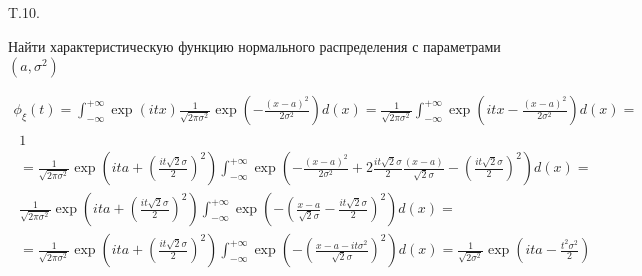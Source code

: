 \documentclass[a4paper,12pt]{article} %
\begin{document}
\begin{example} T.10. 


Найти характеристическую функцию нормального распределения с параметрами $\left(a, \sigma^{2}\right)$





\begin{equation}
\begin{array}{l}
\phi_{\xi}(t)=\int_{-\infty}^{+\infty} \exp (i t x) \frac{1}{\sqrt{2 \pi \sigma^{2}}} \exp \left(-\frac{(x-a)^{2}}{2 \sigma^{2}}\right) d(x)=\frac{1}{\sqrt{2 \pi \sigma^{2}}} \int_{-\infty}^{+\infty} \exp \left(i t x-\frac{(x-a)^{2}}{2 \sigma^{2}}\right) d(x)= \\
\begin{array}{c}
1 \\
=\frac{1}{\sqrt{2 \pi \sigma^{2}}} \exp \left(i t a+\left(\frac{i t \sqrt{2} \sigma}{2}\right)^{2}\right) \int_{-\infty}^{+\infty} \exp \left(-\frac{(x-a)^{2}}{2 \sigma^{2}}+2 \frac{i t \sqrt{2} \sigma}{2} \frac{(x-a)}{\sqrt{2} \sigma}-\left(\frac{i t \sqrt{2} \sigma}{2}\right)^{2}\right) d(x)= \\
\frac{1}{\sqrt{2 \pi \sigma^{2}}} \exp \left(i t a+\left(\frac{i t \sqrt{2} \sigma}{2}\right)^{2}\right) \int_{-\infty}^{+\infty} \exp \left(-\left(\frac{x-a}{\sqrt{2} \sigma}-\frac{i t \sqrt{2} \sigma}{2}\right)^{2}\right) d(x)= \\
=\frac{1}{\sqrt{2 \pi \sigma^{2}}} \exp \left(i t a+\left(\frac{i t \sqrt{2} \sigma}{2}\right)^{2}\right) \int_{-\infty}^{+\infty} \exp \left(-\left(\frac{x-a-i t \sigma^{2}}{\sqrt{2} \sigma}\right)^{2}\right) d(x)=\frac{1}{\sqrt{2 \sigma^{2}}} \exp \left(i t a-\frac{t^{2} \sigma^{2}}{2}\right)
\end{array}
\end{array}
\end{equation}









\end{example}
\end{document}
